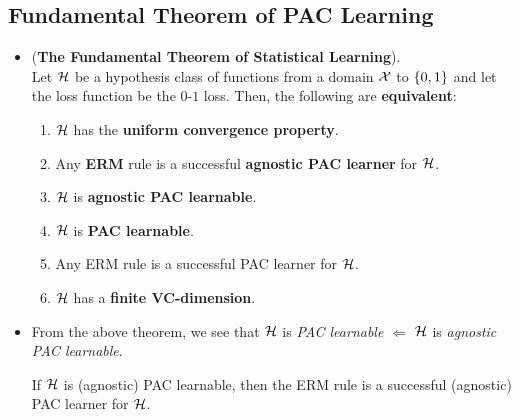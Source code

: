 \documentclass[11pt]{article}
\begin{document}
\subsection{Fundamental Theorem of PAC Learning}
\begin{itemize}
\item \begin{theorem} (\textbf{The Fundamental Theorem of Statistical Learning}). \citep{shalev2014understanding}\\
Let ${\mathcal H}$ be a hypothesis class of functions from a domain ${\mathcal X}$ to $\left\{0,1\right\}$ and let the loss function be the $0$-$1$ loss. Then, the following are \textbf{equivalent}:
\begin{enumerate}
\item ${\mathcal H}$ has the \textbf{uniform convergence property}.
\item Any \textbf{ERM} rule is a successful \textbf{agnostic PAC learner} for ${\mathcal H}$.
\item ${\mathcal H}$ is \textbf{agnostic PAC learnable}.
\item ${\mathcal H}$ is \textbf{PAC learnable}.
\item Any ERM rule is a successful PAC learner for ${\mathcal H}$.
\item ${\mathcal H}$ has a \textbf{finite VC-dimension}.
\end{enumerate}
\end{theorem}

\item \begin{remark}
From the above theorem, we see that ${\mathcal H}$ is \emph{PAC learnable} $\Leftarrow$ ${\mathcal H}$ is \emph{agnostic PAC learnable}.

If ${\mathcal H}$ is (agnostic) PAC learnable, then the ERM rule is a successful (agnostic) PAC learner for ${\mathcal H}$. 
\end{remark}


\end{itemize}
\end{document}
